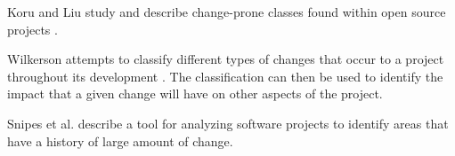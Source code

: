 Koru and Liu study and describe change-prone classes found within open source projects \cite{GunesKoru2007}.

Wilkerson attempts to classify different types of changes that occur to a project throughout its development \cite{Wilkerson2012}. The classification can then be used to identify the impact that a given change will have on other aspects of the project.

Snipes et al. describe a tool for analyzing software projects to identify areas that have a history of large amount of change. \cite{Snipes2011}















